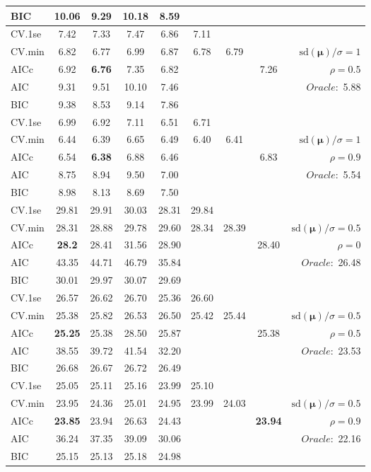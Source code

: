 \begin{table}
\begin{center}
\begin{tabular}{l*{7}{c}|r}
BIC & 10.06 & 9.29 & 10.18 & 8.59 & & & &  \\
 \hline 
CV.1se & 7.42 & 7.33 & 7.47 & 6.86 & 7.11 & & & \\
CV.min & 6.82 & 6.77 & 6.99 & 6.87 & 6.78 & 6.79 & & $\mathrm{sd}(\mathbf{\mu})/\sigma=1$ \\
AICc & 6.92 & {\bf 6.76} & 7.35 & 6.82 & & & 7.26 &  $\rho=0.5$ \\
AIC & 9.31 & 9.51 & 10.10 & 7.46 & & & &  \multirow{2}{*}{$Oracle: $ 5.88} \\
BIC & 9.38 & 8.53 & 9.14 & 7.86 & & & &  \\
 \hline 
CV.1se & 6.99 & 6.92 & 7.11 & 6.51 & 6.71 & & & \\
CV.min & 6.44 & 6.39 & 6.65 & 6.49 & 6.40 & 6.41 & & $\mathrm{sd}(\mathbf{\mu})/\sigma=1$ \\
AICc & 6.54 & {\bf 6.38} & 6.88 & 6.46 & & & 6.83 &  $\rho=0.9$ \\
AIC & 8.75 & 8.94 & 9.50 & 7.00 & & & &  \multirow{2}{*}{$Oracle: $ 5.54} \\
BIC & 8.98 & 8.13 & 8.69 & 7.50 & & & &  \\
 \hline 
CV.1se & 29.81 & 29.91 & 30.03 & 28.31 & 29.84 & & & \\
CV.min & 28.31 & 28.88 & 29.78 & 29.60 & 28.34 & 28.39 & & $\mathrm{sd}(\mathbf{\mu})/\sigma=0.5$ \\
AICc & {\bf 28.2} & 28.41 & 31.56 & 28.90 & & & 28.40 &  $\rho=0$ \\
AIC & 43.35 & 44.71 & 46.79 & 35.84 & & & &  \multirow{2}{*}{$Oracle: $ 26.48} \\
BIC & 30.01 & 29.97 & 30.07 & 29.69 & & & &  \\
 \hline 
CV.1se & 26.57 & 26.62 & 26.70 & 25.36 & 26.60 & & & \\
CV.min & 25.38 & 25.82 & 26.53 & 26.50 & 25.42 & 25.44 & & $\mathrm{sd}(\mathbf{\mu})/\sigma=0.5$ \\
AICc & {\bf 25.25} & 25.38 & 28.50 & 25.87 & & & 25.38 &  $\rho=0.5$ \\
AIC & 38.55 & 39.72 & 41.54 & 32.20 & & & &  \multirow{2}{*}{$Oracle: $ 23.53} \\
BIC & 26.68 & 26.67 & 26.72 & 26.49 & & & &  \\
 \hline 
CV.1se & 25.05 & 25.11 & 25.16 & 23.99 & 25.10 & & & \\
CV.min & 23.95 & 24.36 & 25.01 & 24.95 & 23.99 & 24.03 & & $\mathrm{sd}(\mathbf{\mu})/\sigma=0.5$ \\
AICc & {\bf 23.85} & 23.94 & 26.63 & 24.43 & & & {\bf 23.94} &  $\rho=0.9$ \\
AIC & 36.24 & 37.35 & 39.09 & 30.06 & & & &  \multirow{2}{*}{$Oracle: $ 22.16} \\
BIC & 25.15 & 25.13 & 25.18 & 24.98 & & & &  \\
 \hline 
\end{tabular}
\end{center}
\vspace{-1cm}
\end{table}




